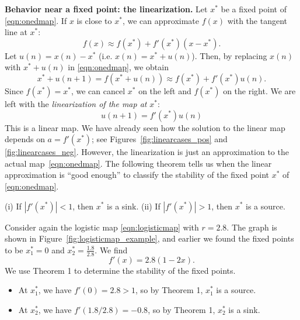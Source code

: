 \noindent
\textbf{Behavior near a fixed point: the linearization.}
Let $x^*$ be a fixed point of \eqref{eqn:onedmap}.
If $x$ is close to $x^*$,
we can approximate $f(x)$ with the tangent line at $x^*$:
\begin{equation}
   f(x) \approx f(x^*) + f'(x^*)(x-x^*).
\end{equation}
Let $u(n) = x(n)-x^*$ (i.e. $x(n) = x^* + u(n)$).
Then, by replacing $x(n)$ with $x^*+u(n)$
in \eqref{eqn:onedmap}, we obtain
\begin{equation}
  x^* + u(n+1) = f(x^*+u(n)) \approx f(x^*)+f'(x^*)u(n).
\end{equation}
Since $f(x^*)=x^*$, we can cancel $x^*$ on the left
and $f(x^*)$ on the right.
We are left with the
\emph{linearization of the map at } $x^*$:
\begin{equation}
  u(n+1) = f'(x^*)u(n)
\end{equation}
This is a linear map.
We have already seen how the solution to the linear
map depends on $a=f'(x^*)$; see Figures~\ref{fig:linearcases_pos}
and \ref{fig:linearcases_neg}.
However, the linearization is just an approximation
to the actual map~\eqref{eqn:onedmap}.
The following theorem tells us when the linear approximation
is ``good enough'' to classify the stability of the
fixed point $x^*$ of \eqref{eqn:onedmap}.

\begin{theorem}
(i) If $|f'(x^*)| < 1$, then $x^*$ is a sink.
(ii) If $|f'(x^*)| > 1$, then $x^*$ is a source.
\end{theorem}

\begin{xexample}
Consider again the logistic map \eqref{eqn:logisticmap}
with $r=2.8$.  The graph is shown in
Figure~\ref{fig:logisticmap_example}, and earlier we found the
fixed points to be $x^*_1=0$ and $x^*_2=\frac{1.8}{2.8}$.
We find
\begin{equation}
  f'(x) = 2.8(1-2x).
\end{equation}
We use Theorem 1 to determine the stability of the fixed points.
\begin{itemize}
\item
At $x^*_1$, we have $f'(0) = 2.8 > 1$, so by Theorem 1,
$x^*_1$ is a source.
\item
At $x^*_2$, we have $f'(1.8/2.8) = -0.8$,
so by Theorem 1,
$x^*_2$ is a sink.
\end{itemize}
\end{xexample}

